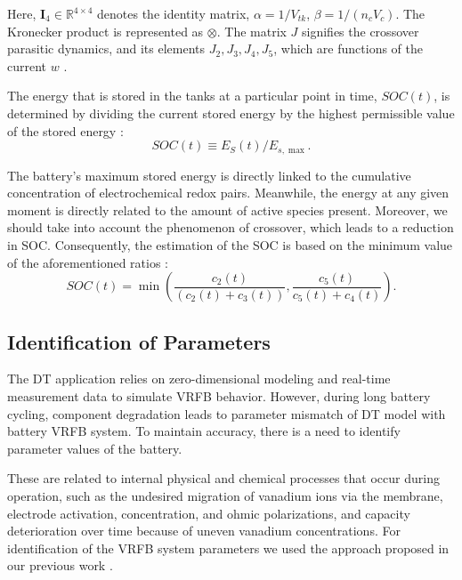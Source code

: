 Here, $\mathbf{I}_4 \in \mathbb{R}^{4 \times 4}$ denotes the identity matrix, $\alpha=1 / V_{tk}$, $\beta=1 /\left(n_c V_c\right)$. The Kronecker product is represented as $\otimes$. The matrix $J$ signifies the crossover parasitic dynamics, and its elements  $J_2,J_3,J_4,J_5$, which are functions of the current $w$ \autocite{pugach_zero_2018}.

The energy that is stored in the tanks at a particular point in time, $SOC(t)$, is determined by dividing the current stored energy by the highest permissible value of the stored energy \autocite{ng_understanding_2010}:
\begin{equation}
    SOC(t) \equiv E_S(t) / E_{s, \max }.
\end{equation}

The battery's maximum stored energy is directly linked to the cumulative concentration of electrochemical redox pairs. Meanwhile, the energy at any given moment is directly related to the amount of active species present.
Moreover, we should take into account the phenomenon of crossover, which leads to a reduction in SOC. Consequently, the estimation of the SOC is based on the minimum value of the aforementioned ratios \autocite{pugach_zero_2018}:
\begin{equation}
    \label{eq:soc_dt}
    SOC(t)=\min \left(\frac{c_2(t)}{\left(c_2(t)+c_3(t)\right)}, \frac{c_5(t)}{c_5(t)+c_4(t)}\right).
\end{equation}


\subsection{Identification of Parameters}\label{subsec:ch3/sec1/sub1}
The DT application relies on zero-dimensional modeling and real-time measurement data to simulate VRFB behavior. However, during long battery cycling, component degradation leads to parameter mismatch of DT model with battery VRFB system. To maintain accuracy, there is a need to identify parameter values of the battery. 

These are related to internal physical and chemical processes that occur during operation, such as the undesired migration of vanadium ions via the membrane, electrode activation, concentration, and ohmic polarizations, and capacity deterioration over time because of uneven vanadium concentrations. For identification of the VRFB system parameters we used the approach proposed in our previous work \autocite{bogdanov_parameter_2023}.

